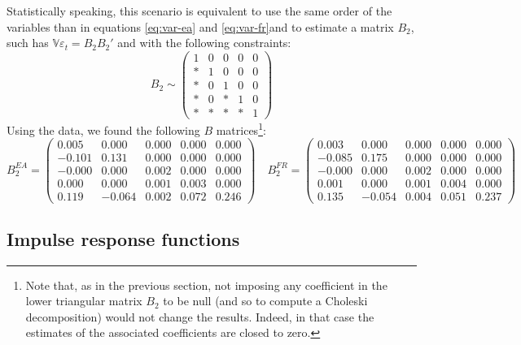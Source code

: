 \documentclass[
  10pt,
]{article}
\begin{document}
Statistically speaking, this scenario is equivalent to use the same order of the variables than in equations \eqref{eq:var-ea} and \eqref{eq:var-fr}and to estimate a matrix \(B_2\), such has \(\mathbb V\varepsilon_t=B_2B_2'\) and with the following constraints:
\[ B_2\sim\begin{pmatrix}1 & 0 & 0 & 0 & 0\\
* & 1 & 0 & 0 & 0\\
* & 0 & 1 & 0 & 0\\
* & 0 & * & 1 & 0\\
* & * & * & * & 1
\end{pmatrix}\]
Using the data, we found the following \(B\) matrices\footnote{
  Note that, as in the previous section, not imposing any coefficient in the lower triangular matrix \(B_2\) to be null (and so to compute a Choleski decomposition) would not change the results. Indeed, in that case the estimates of the associated coefficients are closed to zero.}:
\[B_2^{EA} =\begin{pmatrix}
 0.005 & 0.000 & 0.000 & 0.000 & 0.000 \\
-0.101 & 0.131 & 0.000 & 0.000 & 0.000 \\
-0.000 & 0.000 & 0.002 & 0.000 & 0.000 \\
0.000 & 0.000 & 0.001 & 0.003 & 0.000 \\
0.119 & -0.064 & 0.002 & 0.072 & 0.246 
\end{pmatrix}
\quad
B_2^{FR}=\begin{pmatrix}
 0.003 & 0.000 & 0.000 & 0.000 & 0.000 \\
-0.085 & 0.175 & 0.000 & 0.000 & 0.000 \\
-0.000 & 0.000 & 0.002 & 0.000 & 0.000 \\
0.001 & 0.000 & 0.001 & 0.004 & 0.000 \\
0.135 & -0.054 & 0.004 & 0.051 & 0.237 
\end{pmatrix}\]

\hypertarget{impulse-response-functions}{%
\subsection{Impulse response functions}\label{impulse-response-functions}}
\end{document}
